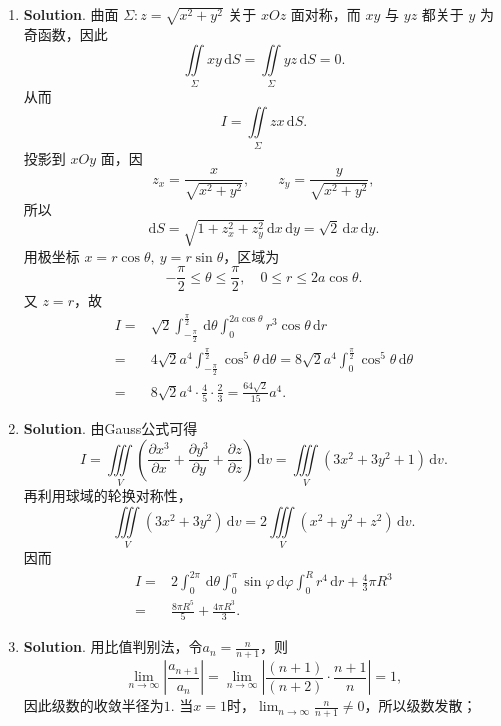 \documentclass[../main.tex]{subfiles}
\begin{document}
\begin{enumerate}
    \item \textbf{Solution}. 曲面 \(\Sigma:z=\sqrt{x^2+y^2}\) 关于 \(xOz\) 面对称，而 \(xy\) 与 \(yz\) 都关于 \(y\) 为奇函数，因此
          \[
              \iint\limits_\Sigma xy\,\mathrm{d}S=\iint\limits_\Sigma yz\,\mathrm{d}S=0.
          \]
          从而
          \[
              I=\iint\limits_\Sigma zx\,\mathrm{d}S.
          \]
          投影到 \(xOy\) 面，因
          \[
              z_x=\frac{x}{\sqrt{x^2+y^2}},\qquad z_y=\frac{y}{\sqrt{x^2+y^2}},
          \]
          所以
          \[
              \mathrm{d}S=\sqrt{1+z_x^2+z_y^2}\,\mathrm{d}x\,\mathrm{d}y=\sqrt2\,\mathrm{d}x\,\mathrm{d}y.
          \]
          用极坐标 \(x=r\cos\theta,\ y=r\sin\theta\)，区域为
          \[
              -\frac{\pi}{2}\le \theta\le \frac{\pi}{2},\quad 0\le r\le 2a\cos\theta.
          \]
          又 \(z=r\)，故
          \[
              \begin{aligned}
                  I= {} & \sqrt2\int_{-\frac{\pi}{2}}^{\frac{\pi}{2}}\,\mathrm{d}\theta\int_0^{2a\cos\theta} r^3\cos\theta\,\mathrm{d}r                                      \\
                  = {}  & 4\sqrt2 a^4\int_{-\frac{\pi}{2}}^{\frac{\pi}{2}}\cos^5\theta\,\mathrm{d}\theta = 8\sqrt{2} a^4\int_0^{\frac{\pi}{2}}\cos^5\theta\,\mathrm{d}\theta \\
                  = {}  & 8\sqrt{2} a^4\cdot \frac{4}{5}\cdot\frac{2}{3} = \frac{64\sqrt2}{15}a^4.
              \end{aligned}
          \]

    \item \textbf{Solution}. 由Gauss公式可得
          \[
              I=\iiint\limits_V\left(\frac{\partial x^3}{\partial x}+\frac{\partial y^3}{\partial y}+\frac{\partial z}{\partial z}\right)\,\mathrm{d}v
              =\iiint\limits_V(3x^2+3y^2+1)\,\mathrm{d}v.
          \]
          再利用球域的轮换对称性，
          \[
              \iiint\limits_V(3x^2+3y^2)\,\mathrm{d}v=2\iiint\limits_V(x^2+y^2+z^2)\,\mathrm{d}v.
          \]
          因而
          \[
              \begin{aligned}
                  I= {} & 2\int_{0}^{2\pi}\,\mathrm{d}\theta\int_{0}^{\pi}\sin\varphi\,\mathrm{d}\varphi\int_{0}^{R}r^4\,\mathrm{d}r+\frac{4}{3}\pi R^3 \\
                  = {}  & \frac{8\pi R^5}{5}+\frac{4\pi R^3}{3}.
              \end{aligned}
          \]

    \item \textbf{Solution}. 用比值判别法，令$a_n=\frac{n}{n+1}$，则
          \[
              \lim_{n\to\infty}\left|\frac{a_{n+1}}{a_n}\right|=\lim_{n\to\infty}\left|\frac{(n+1)}{(n+2)}\cdot\frac{n+1}{n}\right|=1,
          \]
          因此级数的收敛半径为$1$. 当$x=1$时，$\lim_{n\to\infty}\frac{n}{n+1}\neq0$，所以级数发散；


\end{enumerate}
\end{document}

